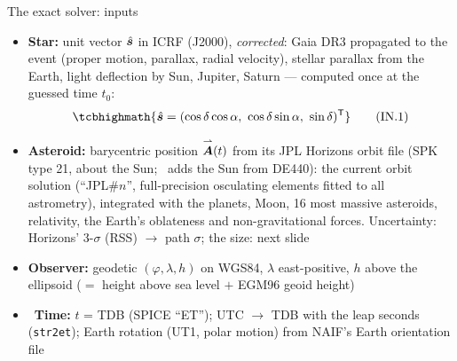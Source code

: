 \begin{frame}{The exact solver: inputs}
  \footnotesize
  \begin{itemize}
    \item \textbf{Star:} unit vector $\hat{\bm{s}}$ in ICRF (J2000), \emph{corrected}: Gaia DR3 propagated to the event
          (proper motion, parallax, radial velocity), stellar parallax from the Earth, light deflection by
          Sun, Jupiter, Saturn --- computed once at the guessed time $t_0$:
          \[
            \tcbhighmath{\uv{s} = (\cos\delta\cos\alpha,\ \cos\delta\sin\alpha,\ \sin\delta)^{\mathsf T}}
            \tag{IN.1}
          \]
    \item \textbf{Asteroid:} barycentric position $\overset{\rightharpoonup}{\bm{A}}(t)$ from its JPL Horizons orbit file (SPK type 21, about the
          Sun; \SP\ adds the Sun from DE440): the current orbit solution (``JPL\#$n$'', full-precision osculating
          elements fitted to all astrometry), integrated with the planets, Moon, 16 most massive asteroids, relativity,
          the Earth's oblateness and non-gravitational forces. Uncertainty: Horizons' 3-$\sigma$ (RSS) $\to$ path
          $\sigma$; the size: next slide
    \item \textbf{Observer:} geodetic $(\varphi, \lambda, h)$ on WGS84, $\lambda$ east-positive, $h$ above the ellipsoid
          ($=$ height above sea level $+$ EGM96 geoid height)
    \item \SP\ \textbf{Time:} $t$ = TDB (SPICE ``ET''); UTC $\to$ TDB with
          the leap seconds (\texttt{str2et}); Earth rotation (UT1, polar motion) from NAIF's Earth orientation file
  \end{itemize}
\end{frame}

